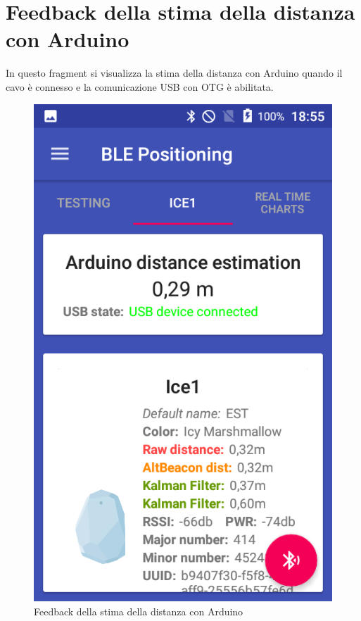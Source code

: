 \section{Feedback della stima della distanza con Arduino}
In questo fragment si visualizza la stima della distanza con Arduino quando il cavo è connesso e la comunicazione USB con OTG è abilitata.
\begin{figure}[ph]
	\centering
	\includegraphics[width=.35\linewidth]{img/app/20.png}
	\caption{Feedback della stima della distanza con Arduino}
\end{figure}

